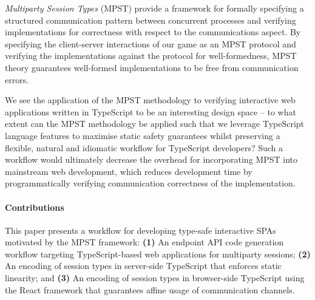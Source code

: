 \textit{Multiparty Session Types} (MPST) \cite{MPST} provide a framework for
formally specifying a structured communication pattern between concurrent
processes and verifying implementations for correctness with respect to the
communications aspect.
By specifying the client-server interactions of our game as an MPST protocol
and verifying the implementations against the protocol for well-formedness,
MPST theory guarantees well-formed implementations to be free from
communication errors.

We see the application of the MPST methodology to verifying interactive web
applications written in TypeScript to be an interesting design space -- to what
extent can the MPST methodology be applied such that we leverage TypeScript
language features to maximise static safety guarantees whilst preserving a
flexible, natural and idiomatic workflow for TypeScript developers?
Such a workflow would ultimately decrease the overhead for incorporating MPST
into mainstream web development, which reduces development time by programmatically
verifying communication correctness of the implementation.

\paragraph{Contributions}
This paper presents a workflow for developing type-safe interactive SPAs
motivated by the MPST framework:
\textbf{(1)} An endpoint API code generation
workflow targeting TypeScript-based web applications for multiparty sessions;
\textbf{(2)} An encoding of session types in server-side TypeScript that
enforces static linearity;
and \textbf{(3)} An encoding of session types in
browser-side TypeScript using the React framework that guarantees affine usage
of communication channels.


